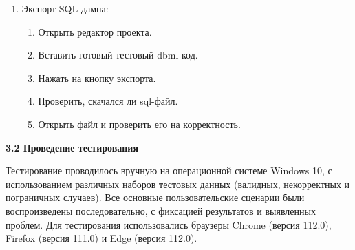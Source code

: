 \begin{enumerate}
 \item Экспорт SQL-дампа:
    \begin{enumerate}
        \item Открыть редактор проекта.
        \item Вставить готовый тестовый dbml код.
        \item Нажать на кнопку экспорта.
        \item Проверить, скачался ли sql-файл.
        \item Открыть файл и проверить его на корректность.
    \end{enumerate}
    
\end{enumerate}


\textbf{\large 3.2 Проведение тестирования}

Тестирование проводилось вручную на операционной системе Windows 10, с использованием различных наборов тестовых данных (валидных, некорректных и пограничных случаев). Все основные пользовательские сценарии были воспроизведены последовательно, с фиксацией результатов и выявленных проблем. Для тестирования использовались браузеры Chrome (версия 112.0), Firefox (версия 111.0) и Edge (версия 112.0).


